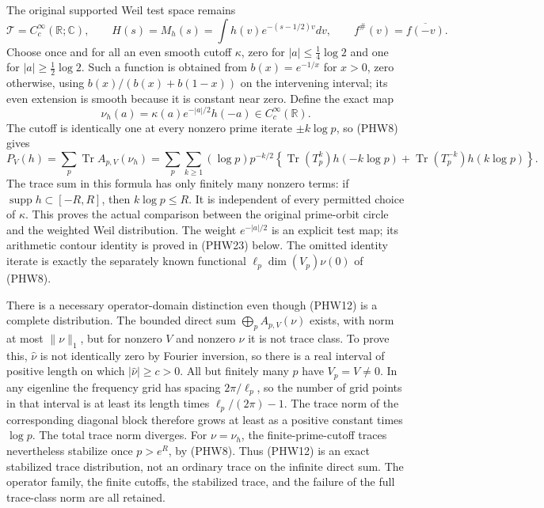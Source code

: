 \documentclass[
  10pt,
  a4paper,
]{article}
\begin{document}
The original supported Weil test space remains \[
\mathcal T=C_c^\infty(\mathbb R;\mathbb C),\qquad
H(s)=M_h(s)=\int h(v)e^{-(s-1/2)v}dv,
\qquad f^\#(v)=\overline{f(-v)}.
\tag{PHW10}
\] Choose once and for all an even smooth cutoff \(\kappa\), zero for
\(|a|\le\tfrac14\log2\) and one for \(|a|\ge\tfrac12\log2\). Such a
function is obtained from \(b(x)=e^{-1/x}\) for \(x>0\), zero otherwise,
using \(b(x)/(b(x)+b(1-x))\) on the intervening interval; its even
extension is smooth because it is constant near zero. Define the exact
map \[
\nu_h(a)=\kappa(a)e^{-|a|/2}h(-a)\in C_c^\infty(\mathbb R).
\tag{PHW11}
\] The cutoff is identically one at every nonzero prime iterate
\(\pm k\log p\), so (PHW8) gives \[
\boxed{
P_V(h)=\sum_p\operatorname{Tr}A_{p,V}(\nu_h)
=\sum_p\sum_{k\ge1}(\log p)p^{-k/2}
\left\{\operatorname{Tr}(T_p^k)h(-k\log p)
+\operatorname{Tr}(T_p^{-k})h(k\log p)\right\}.
}
\tag{PHW12}
\] The trace sum in this formula has only finitely many nonzero terms:
if \(\operatorname{supp}h\subset[-R,R]\), then \(k\log p\le R\). It is
independent of every permitted choice of \(\kappa\). This proves the
actual comparison between the original prime-orbit circle and the
weighted Weil distribution. The weight \(e^{-|a|/2}\) is an explicit
test map; its arithmetic contour identity is proved in (PHW23) below.
The omitted identity iterate is exactly the separately known functional
\(\ell_p\dim(V_p)\nu(0)\) of (PHW8).

There is a necessary operator-domain distinction even though (PHW12) is
a complete distribution. The bounded direct sum
\(\bigoplus_p A_{p,V}(\nu)\) exists, with norm at most \(\|\nu\|_1\),
but for nonzero \(V\) and nonzero \(\nu\) it is not trace class. To
prove this, \(\widehat\nu\) is not identically zero by Fourier
inversion, so there is a real interval of positive length on which
\(|\widehat\nu|\ge c>0\). All but finitely many \(p\) have
\(V_p=V\ne0\). In any eigenline the frequency grid has spacing
\(2\pi/\ell_p\), so the number of grid points in that interval is at
least its length times \(\ell_p/(2\pi)-1\). The trace norm of the
corresponding diagonal block therefore grows at least as a positive
constant times \(\log p\). The total trace norm diverges. For
\(\nu=\nu_h\), the finite-prime-cutoff traces nevertheless stabilize
once \(p>e^R\), by (PHW8). Thus (PHW12) is an exact stabilized trace
distribution, not an ordinary trace on the infinite direct sum. The
operator family, the finite cutoffs, the stabilized trace, and the
failure of the full trace-class norm are all retained.
\end{document}
